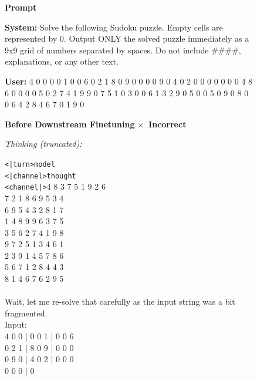 \begin{figure}[htbp]
\scriptsize
\begin{mdframed}[style=promptbox]
\noindent\textbf{Prompt}

\vspace{2pt}\noindent
\textbf{System:} Solve the following Sudoku puzzle. Empty cells are represented by 0. Output ONLY the solved puzzle immediately as a 9x9 grid of numbers separated by spaces. Do not include \#\#\#\#, explanations, or any other text.

\vspace{4pt}\noindent
\textbf{User:} 4 0 0 0 0 1 0 0 6 0 2 1 8 0 9 0 0 0 0 9 0 4 0 2 0 0 0 0 0 0 0 4 8 6 0 0 0 0 5 0 2 7 4 1 9 9 0 7 5 1 0 3 0 0 6 1 3 2 9 0 5 0 0 5 0 9 0 8 0 0 6 4 2 8 4 6 7 0 1 9 0
\end{mdframed}
\vspace{2pt}
\noindent
\begin{minipage}[t]{0.49\textwidth}
\begin{mdframed}[style=beforebox]
\noindent\textbf{Before Downstream Finetuning} \hfill {\colorbox{beforebg}{\textcolor{beforeframe}{\textbf{$\boldsymbol\times$~Incorrect }}}}

\noindent\textit{Thinking (truncated):}
\begin{mdframed}[style=thinkbox]
\texttt{<|turn>model} \\
\texttt{<|channel>thought} \\
\texttt{<channel|>}4 8 3 7 5 1 9 2 6 \\
7 2 1 8 6 9 5 3 4 \\
6 9 5 4 3 2 8 1 7 \\
1 4 8 9 9 6 3 7 5 \\
3 5 6 2 7 4 1 9 8 \\
9 7 2 5 1 3 4 6 1 \\
2 3 9 1 4 5 7 8 6 \\
5 6 7 1 2 8 4 4 3 \\
8 1 4 6 7 6 2 9 5 \\
\\
Wait, let me re-solve that carefully as the input string was a bit fragmented. \\
Input: \\
4 0 0 | 0 0 1 | 0 0 6 \\
0 2 1 | 8 0 9 | 0 0 0 \\
0 9 0 | 4 0 2 | 0 0 0 \\
0 0 0 | 0


\end{mdframed}
\end{mdframed}
\end{minipage}
\end{figure}
